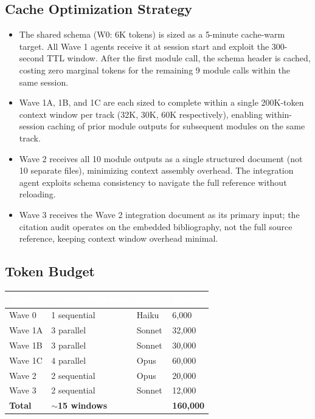 \documentclass[11pt,letterpaper]{article}
\newcommand{\tableheader}[1]{\textbf{\sffamily\textcolor{white}{#1}}}
\begin{document}
\subsection{Cache Optimization Strategy}

\begin{itemize}[leftmargin=*]
  \item The shared schema (W0: 6K tokens) is sized as a 5-minute cache-warm target. All Wave 1 agents receive it at session start and exploit the 300-second TTL window. After the first module call, the schema header is cached, costing zero marginal tokens for the remaining 9 module calls within the same session.
  \item Wave 1A, 1B, and 1C are each sized to complete within a single 200K-token context window per track (32K, 30K, 60K respectively), enabling within-session caching of prior module outputs for subsequent modules on the same track.
  \item Wave 2 receives all 10 module outputs as a single structured document (not 10 separate files), minimizing context assembly overhead. The integration agent exploits schema consistency to navigate the full reference without reloading.
  \item Wave 3 receives the Wave 2 integration document as its primary input; the citation audit operates on the embedded bibliography, not the full source reference, keeping context window overhead minimal.
\end{itemize}

\subsection{Token Budget}

\begin{center}
\begin{tabularx}{\textwidth}{L{3cm}C{2.5cm}C{2cm}C{2cm}}
\toprule
{}
\tableheader{Wave} & \tableheader{Context Windows} & \tableheader{Model} & \tableheader{Tokens} \\
\midrule
Wave 0 & 1 sequential & Haiku & 6,000 \\
Wave 1A & 3 parallel & Sonnet & 32,000 \\
Wave 1B & 3 parallel & Sonnet & 30,000 \\
Wave 1C & 4 parallel & Opus & 60,000 \\
Wave 2 & 2 sequential & Opus & 20,000 \\
Wave 3 & 2 sequential & Sonnet & 12,000 \\
\midrule
\textbf{Total} & \textbf{$\sim$15 windows} & & \textbf{160,000} \\
\bottomrule
\end{tabularx}
\end{center}
\end{document}
